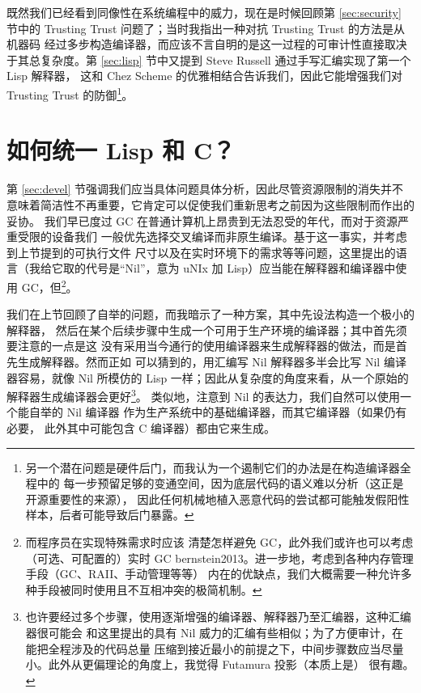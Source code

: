 既然我们已经看到同像性在系统编程中的威力，现在是时候回顾第 \ref{sec:security}
节中的 Trusting Trust 问题了；当时我指出一种对抗 Trusting Trust 的方法是从机器码
经过多步构造编译器，而应该不言自明的是这一过程的可审计性直接取决于其总复杂度。第
\ref{sec:lisp} 节中又提到 Steve Russell 通过手写汇编实现了第一个 Lisp 解释器，
这和 Chez Scheme 的优雅相结合告诉我们，因此它能增强我们对 Trusting Trust 的防御\footnote%
{另一个潜在问题是硬件后门，而我认为一个遏制它们的办法是在构造编译器全程中的
每一步预留足够的变通空间，因为底层代码的语义难以分析（这正是开源重要性的来源），
因此任何机械地植入恶意代码的尝试都可能触发假阳性样本，后者可能导致后门暴露。}。

\section{如何统一 Lisp 和 C？}\label{sec:howto}

第 \ref{sec:devel} 节强调我们应当具体问题具体分析，因此尽管资源限制的消失并不
意味着简洁性不再重要，它肯定可以促使我们重新思考之前因为这些限制而作出的妥协。
我们早已度过 GC 在普通计算机上昂贵到无法忍受的年代，而对于资源严重受限的设备我们
一般优先选择交叉编译而非原生编译。基于这一事实，并考虑到上节提到的可执行文件
尺寸以及在实时环境下的需求等等问题，这里提出的语言（我给它取的代号是“Nil”，意为
uNIx 加 Lisp）应当能在解释器和编译器中使用 GC，但\footnote{而程序员在实现特殊需求时应该
清楚怎样避免 GC，此外我们或许也可以考虑（可选、可配置的）实时 GC\cupercite%
{bernstein2013}。进一步地，考虑到各种内存管理手段（GC、RAII、手动管理等等）
内在的优缺点，我们大概需要一种允许多种手段被同时使用且不互相冲突的极简机制。}。

我们在上节回顾了自举的问题，而我暗示了一种方案，其中先设法构造一个极小的解释器，
然后在某个后续步骤中生成一个可用于生产环境的编译器；其中首先须要注意的一点是这
没有采用当今通行的使用编译器来生成解释器的做法，而是首先生成解释器。然而正如
可以猜到的，用汇编写 Nil 解释器多半会比写 Nil 编译器容易，就像 Nil 所模仿的
Lisp 一样；因此从复杂度的角度来看，从一个原始的解释器生成编译器会更好\footnote%
{也许要经过多个步骤，使用逐渐增强的编译器、解释器乃至汇编器，这种汇编器很可能会
和这里提出的具有 Nil 威力的汇编有些相似；为了方便审计，在能把全程涉及的代码总量
压缩到接近最小的前提之下，中间步骤数应当尽量小。此外从更偏理论的角度上，我觉得
Futamura 投影（本质上是） 很有趣。}。
类似地，注意到 Nil 的表达力，我们自然可以使用一个能自举的 Nil 编译器
作为生产系统中的基础编译器，而其它编译器（如果仍有必要，
此外其中可能包含 C 编译器）都由它来生成。


